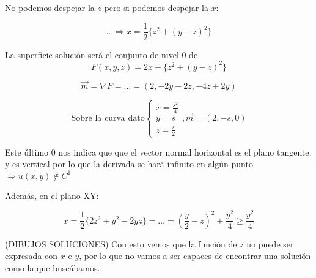 \begin{example}{6}
		No podemos despejar la $z$ pero si podemos despejar la $x$:

		\[
		… \Rightarrow x = \frac{1}{2} \{z^2 + (y-z)^2\}
		\]

		La superficie solución será el conjunto de nivel 0 de \[F(x,y,z)=2x-\{z^2 + (y-z)^2\}\]

		\[\vec{m} = \nabla F = … = (2,-2y+2z, -4z+2y)\]

		\[
		\text{Sobre la curva dato}\left\{\begin{array}{l}
			x=\frac{s^2}{4} \\
			y = s \\
			z = \frac{s}{2}
		\end{array}\right., \vec{m} = (2,-s,0)
		\]

		Este último 0 nos indica que que el vector normal horizontal es el plano tangente, y es vertical por lo que la derivada se hará infinito en algún punto $\Rightarrow u(x,y) \notin C^1$

		Además, en el plano XY:

		\[x = \frac{1}{2} \{2z^2 + y^2 - 2yz\} = … = (\frac{y}{2} - z)^2 + \frac{y^2}{4} \geq \frac{y^2}{4}\]

		(DIBUJOS SOLUCIONES)
		Con esto vemos que la función de $z$ no puede ser expresada con $x$ e $y$, por lo que no vamos a ser capaces de encontrar una solución como la que buscábamos.


	\end{example}

